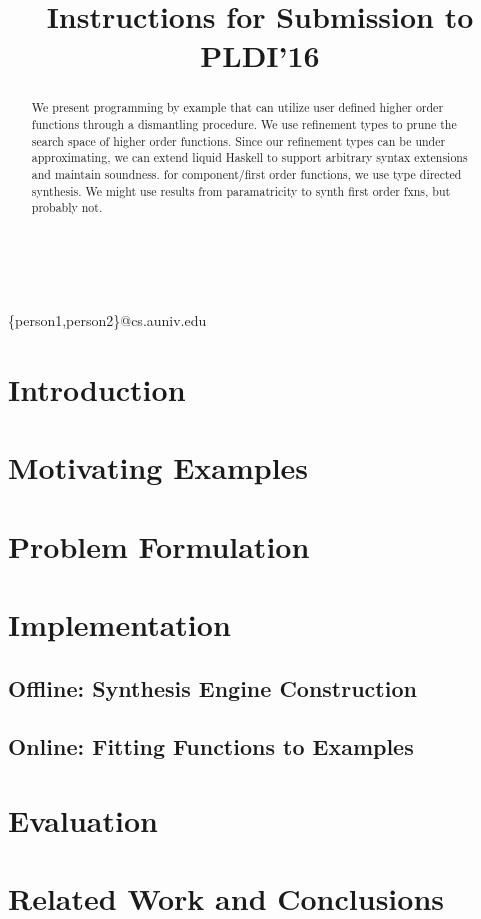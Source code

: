 \documentclass[pldi]{sigplanconf-pldi16}
\begin{document}
\title{Instructions for Submission to PLDI'16}

%
%

{ \\
  \\
}
{\{person1,person2\}@cs.auniv.edu}



\maketitle

\begin{abstract}
  We present programming by example that can utilize user defined higher order functions through a dismantling procedure.
  We use refinement types to prune the search space of higher order functions.
  Since our refinement types can be under approximating, we can extend liquid Haskell to support arbitrary syntax extensions and maintain soundness.
  for component/first order functions, we use type directed synthesis.
  We might use results from paramatricity to synth first order fxns, but probably not.
\end{abstract}


\section{Introduction} \label{intro}



\section{Motivating Examples} \label{examples}


\section{Problem Formulation} \label{problem}


\section{Implementation}


\subsection{Offline: Synthesis Engine Construction}


\subsection{Online: Fitting Functions to Examples}


\section{Evaluation}


\section{Related Work and Conclusions}\label{conclusions}




\end{document}

